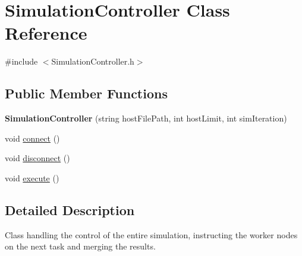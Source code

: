 \hypertarget{classSimulationController}{
\section{SimulationController Class Reference}
\label{classSimulationController}
}


{\ttfamily \#include $<$SimulationController.h$>$}\subsection*{Public Member Functions}
\begin{DoxyCompactItemize}
\item 
\hypertarget{classSimulationController_ad3842750a34161c40e2503601d0d7261}{
{\bfseries SimulationController} (string hostFilePath, int hostLimit, int simIteration)}
\label{classSimulationController_ad3842750a34161c40e2503601d0d7261}

\item 
void \hyperlink{classSimulationController_a37b7e33fd9ea6d3505cc8ae1dbbbf284}{connect} ()
\item 
void \hyperlink{classSimulationController_a269e17c70a9661843bbd536d62dc771f}{disconnect} ()
\item 
void \hyperlink{classSimulationController_a5b756fb934ac05829b28e46a85a6497d}{execute} ()
\end{DoxyCompactItemize}


\subsection{Detailed Description}
Class handling the control of the entire simulation, instructing the worker nodes on the next task and merging the results. 

